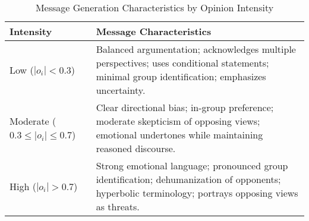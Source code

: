 \begin{table}[h!]
\centering
\small
\caption{Message Generation Characteristics by Opinion Intensity}
\label{tab:message-intensity}
\begin{tabularx}{\textwidth}{lX}
\toprule
\textbf{Intensity} & \textbf{Message Characteristics} \\
\midrule
Low ($|o_i| < 0.3$) & Balanced argumentation; acknowledges multiple perspectives; uses conditional statements; minimal group identification; emphasizes uncertainty. \\
Moderate ($0.3 \leq |o_i| \leq 0.7$) & Clear directional bias; in-group preference; moderate skepticism of opposing views; emotional undertones while maintaining reasoned discourse. \\
High ($|o_i| > 0.7$) & Strong emotional language; pronounced group identification; dehumanization of opponents; hyperbolic terminology; portrays opposing views as threats. \\
\bottomrule
\end{tabularx}
\end{table}